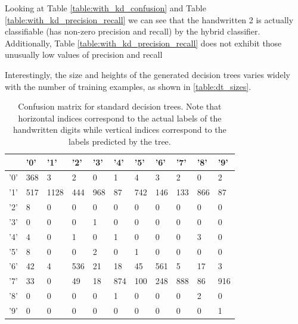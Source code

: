Looking at Table \ref{table:with_kd_confusion} and Table \ref{table:with_kd_precision_recall} we can see that the handwritten 2 is actually classifiable (has non-zero precision and recall) by the hybrid classifier.  Additionally, Table \ref{table:with_kd_precision_recall} does not exhibit those unusually low values of precision and recall

Interestingly, the size and heights of the generated decision trees varies widely with the number of training examples, as shown in \ref{table:dt_sizes}.

\begin{table}
	\begin{tabular}{l|llllllllll}
		&   '0' &   '1' &   '2' &   '3' &   '4' &   '5' &   '6' &   '7' &   '8' &   '9' \\
		\hline
		'0' &   368 &     3 &     2 &     0 &     1 &     4 &     3 &     2 &     0 &     2 \\
		'1' &   517 &  1128 &   444 &   968 &    87 &   742 &   146 &   133 &   866 &    87 \\
		'2' &     8 &     0 &     0 &     0 &     0 &     0 &     0 &     0 &     0 &     0 \\
		'3' &     0 &     0 &     0 &     1 &     0 &     0 &     0 &     0 &     0 &     0 \\
		'4' &     4 &     0 &     1 &     0 &     1 &     0 &     0 &     0 &     3 &     0 \\
		'5' &     8 &     0 &     0 &     2 &     0 &     1 &     0 &     0 &     0 &     0 \\
		'6' &    42 &     4 &   536 &    21 &    18 &    45 &   561 &     5 &    17 &     3 \\
		'7' &    33 &     0 &    49 &    18 &   874 &   100 &   248 &   888 &    86 &   916 \\
		'8' &     0 &     0 &     0 &     0 &     1 &     0 &     0 &     0 &     2 &     0 \\
		'9' &     0 &     0 &     0 &     0 &     0 &     0 &     0 &     0 &     0 &     1 \\
	\end{tabular}
	\caption{Confusion matrix for standard decision trees.  Note that horizontal indices correspond to the actual labels of the handwritten digits while vertical indices correspond to the labels predicted by the tree.}
	\label{table:no_kd_confusion}
\end{table}

